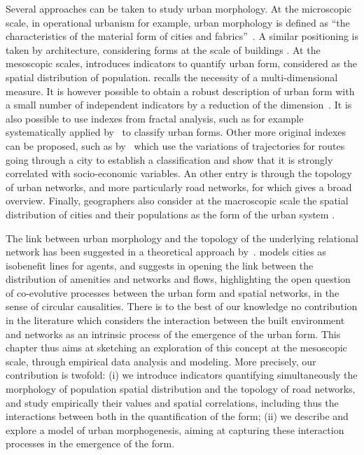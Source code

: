 \documentclass[11pt]{article}
\begin{document}
Several approaches can be taken to study urban morphology. At the microscopic scale, in operational urbanism for example, urban morphology is defined as ``the characteristics of the material form of cities and fabrics''~\citep{paquot2010abc}. A similar positioning is taken by architecture, considering forms at the scale of buildings \citep{moudon1997urban}. At the mesoscopic scales, \cite{tsai2005quantifying} introduces indicators to quantify urban form, considered as the spatial distribution of population. \cite{le2009quantifier} recalls the necessity of a multi-dimensional measure. It is however possible to obtain a robust description of urban form with a small number of independent indicators by a reduction of the dimension~\citep{Schwarz201029}. It is also possible to use indexes from fractal analysis, such as for example systematically applied by~\cite{2016arXiv160808839C} to classify urban forms. Other more original indexes can be proposed, such as by~\cite{lee2017morphology} which use the variations of trajectories for routes going through a city to establish a classification and show that it is strongly correlated with socio-economic variables. An other entry is through the topology of urban networks, and more particularly road networks, for which \citep{2015arXiv151201268L} gives a broad overview. Finally, geographers also consider at the macroscopic scale the spatial distribution of cities and their populations as the form of the urban system \citep{pumain2011systems}.




The link between urban morphology and the topology of the underlying relational network has been suggested in a theoretical approach by~\cite{badariotti2007conception}. \cite{d2015mathematize} models cities as isobenefit lines for agents, and suggests in opening the link between the distribution of amenities and networks and flows, highlighting the open question of co-evolutive processes between the urban form and spatial networks, in the sense of circular causalities. There is to the best of our knowledge no contribution in the literature which considers the interaction between the built environment and networks as an intrinsic process of the emergence of the urban form. This chapter thus aims at sketching an exploration of this concept at the mesoscopic scale, through empirical data analysis and modeling. More precisely, our contribution is twofold: (i) we introduce indicators quantifying simultaneously the morphology of population spatial distribution and the topology of road networks, and study empirically their values and spatial correlations, including thus the interactions between both in the quantification of the form; (ii) we describe and explore a model of urban morphogenesis, aiming at capturing these interaction processes in the emergence of the form.
\end{document}
